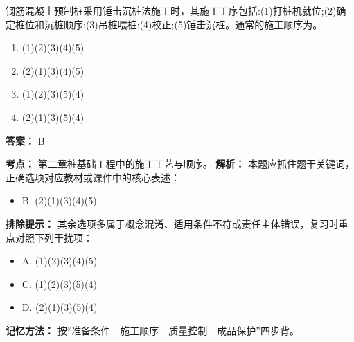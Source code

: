 \documentclass[UTF8,fontset=fandol,11pt]{ctexart}
\begin{document}
\vspace{0.2em}

\begin{quizbox}[title={第 7 题}]
钢筋混凝土预制桩采用锤击沉桩法施工时，其施工工序包括:(1)打桩机就位;(2)确定桩位和沉桩顺序;(3)吊桩喂桩;(4)校正;(5)锤击沉桩。通常的施工顺序为。\\
\begin{enumerate}[label=\Alph*.]
\item (1)(2)(3)(4)(5)
\item (2)(1)(3)(4)(5)
\item (1)(2)(3)(5)(4)
\item (2)(1)(3)(5)(4)
\end{enumerate}
\textbf{答案：} B
\vspace{0.25em}
\begin{answerbox}[title={考点解析}]
\textbf{考点：} 第二章桩基础工程中的施工工艺与顺序。
\textbf{解析：} 本题应抓住题干关键词，正确选项对应教材或课件中的核心表述：
\begin{itemize}
\item B. (2)(1)(3)(4)(5)
\end{itemize}
\textbf{排除提示：} 其余选项多属于概念混淆、适用条件不符或责任主体错误，复习时重点对照下列干扰项：
\begin{itemize}
\item A. (1)(2)(3)(4)(5)
\item C. (1)(2)(3)(5)(4)
\item D. (2)(1)(3)(5)(4)
\end{itemize}
\textbf{记忆方法：} 按“准备条件—施工顺序—质量控制—成品保护”四步背。
\end{answerbox}
\end{quizbox}

\vspace{0.2em}
\end{document}
